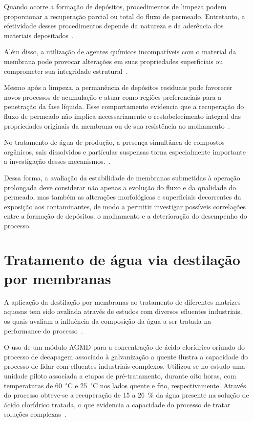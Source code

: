 Quando ocorre a formação de depósitos, procedimentos de limpeza podem proporcionar a recuperação parcial ou total do fluxo de permeado. Entretanto, a efetividade desses procedimentos depende da natureza e da aderência dos materiais depositados~\cite{AbdelKarim2021,Hsieh2021Pretreatments}. 

Além disso, a utilização de agentes químicos incompatíveis com o material da membrana pode provocar alterações em suas propriedades superficiais ou comprometer sua integridade estrutural~\cite{AbdelKarim2021,Hsieh2021Pretreatments}.

Mesmo após a limpeza, a permanência de depósitos residuais pode favorecer novos processos de acumulação e atuar como regiões preferenciais para a penetração da fase líquida. Esse comportamento evidencia que a recuperação do fluxo de permeado não implica necessariamente o restabelecimento integral das propriedades originais da membrana ou de sua resistência ao molhamento~\cite{AbdelKarim2021,Hsieh2021Pretreatments}.

No tratamento de água de produção, a presença simultânea de compostos orgânicos, sais dissolvidos e partículas suspensas torna especialmente importante a investigação desses mecanismos.~\cite{AbdelKarim2021,Hsieh2021Pretreatments}.

Dessa forma, a avaliação da estabilidade de membranas submetidas à operação prolongada deve considerar não apenas a evolução do fluxo e da qualidade do permeado, mas também as alterações morfológicas e superficiais decorrentes da exposição aos contaminantes, de modo a permitir investigar possíveis correlações entre a formação de depósitos, o molhamento e a deterioração do desempenho do processo.

\section{Tratamento de água via destilação por membranas}

A aplicação da destilação por membranas ao tratamento de diferentes matrizes aquosas tem sido avaliada através de estudos com diversos efluentes industriais, os quais avaliam a influência da composição da água a ser tratada na performance do processo~\cite{Gueccia2021HClRecovery,Su2017,RuizAguirre2019PermeateQuality,Woo2021ElectrospunMD,Suga2021VMD,Kujawa_PVDF_SWCNH,Abdelrazeq2022DCMD,Adham2023}. 

O uso de um módulo AGMD para a concentração de ácido clorídrico oriundo do processo de decapagem associado à galvanização a quente ilustra a capacidade do processo de lidar com efluentes industriais complexos. Utilizou-se no estudo uma unidade piloto associada a etapas de pré-tratamento, durante oito horas, com temperaturas de 60~$^\circ$C e 25~$^\circ$C nos lados quente e frio, respectivamente. Através do processo obteve-se a recuperação de 15 a 26~\% da água presente na solução de ácido clorídrico tratada, o que evidencia a capacidade do processo de tratar soluções complexas~\cite{Gueccia2021HClRecovery}.

